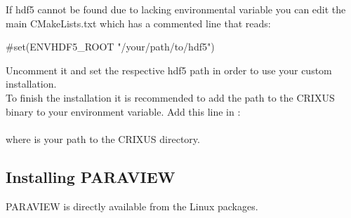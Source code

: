 \documentclass{../GPUSPHtemplate}
\begin{document}
If hdf5 cannot be found due to lacking environmental variable you can edit the main CMakeLists.txt which has a commented line that reads:
\begin{shellcode}
#set(ENV{HDF5_ROOT} "/your/path/to/hdf5")
\end{shellcode}
Uncomment it and set the respective hdf5 path in order to use your custom installation.\\

To finish the installation it is recommended to add the path to the CRIXUS binary to your
 environment variable. Add this line in :\\
\\
where  is your path to the CRIXUS directory.

\subsection{Installing PARAVIEW}

PARAVIEW is directly available from the Linux packages.


\end{document}
